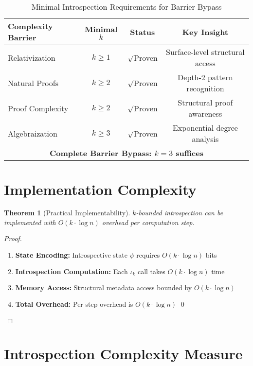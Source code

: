 \documentclass[11pt]{article}
\newtheorem{theorem}{Theorem}[section]
\theoremstyle{definition}
\renewcommand{\checkmark}{$\surd$}
\begin{document}
\begin{table}[ht]
\centering
\caption{Minimal Introspection Requirements for Barrier Bypass}
\label{tab:barrier-minimality}
\begin{tabular}{|l|c|c|c|}
\hline
\textbf{Complexity Barrier} & \textbf{Minimal $k$} & \textbf{Status} & \textbf{Key Insight} \\
\hline
Relativization & $k \geq 1$ & \checkmark Proven & Surface-level structural access \\
\hline
Natural Proofs & $k \geq 2$ & \checkmark Proven & Depth-2 pattern recognition \\
\hline
Proof Complexity & $k \geq 2$ & \checkmark Proven & Structural proof awareness \\
\hline
Algebraization & $k \geq 3$ & \checkmark Proven & Exponential degree analysis \\
\hline
\multicolumn{4}{|c|}{\textbf{Complete Barrier Bypass: $k = 3$ suffices}} \\
\hline
\end{tabular}
\end{table}

\section{Implementation Complexity}

\begin{theorem}[Practical Implementability]
$k$-bounded introspection can be implemented with $O(k \cdot \log n)$ overhead per computation step.
\end{theorem}

\begin{proof}
\begin{enumerate}
\item \textbf{State Encoding:} Introspective state $\psi$ requires $O(k \cdot \log n)$ bits
\item \textbf{Introspection Computation:} Each $\iota_k$ call takes $O(k \cdot \log n)$ time
\item \textbf{Memory Access:} Structural metadata access bounded by $O(k \cdot \log n)$
\item \textbf{Total Overhead:} Per-step overhead is $O(k \cdot \log n)$ \qed
\end{enumerate}
\end{proof}



\section{Introspection Complexity Measure}
\end{document}
